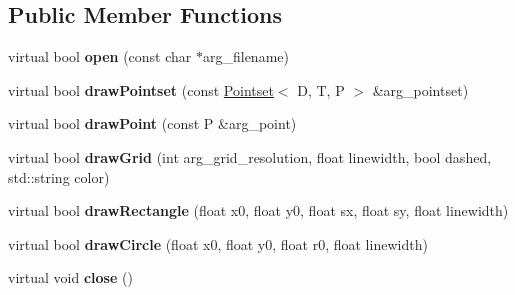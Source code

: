 \subsection*{Public Member Functions}
\begin{DoxyCompactItemize}
\item 
\hypertarget{classutk_1_1PointsetIllustrator__Model_a4e155743e54ce253799e0373ecec25b0}{virtual bool {\bfseries open} (const char $\ast$arg\-\_\-filename)}\label{classutk_1_1PointsetIllustrator__Model_a4e155743e54ce253799e0373ecec25b0}

\item 
\hypertarget{classutk_1_1PointsetIllustrator__Model_a3f846cd33157bd43504120e8807a8d13}{virtual bool {\bfseries draw\-Pointset} (const \hyperlink{classutk_1_1Pointset}{Pointset}$<$ D, T, P $>$ \&arg\-\_\-pointset)}\label{classutk_1_1PointsetIllustrator__Model_a3f846cd33157bd43504120e8807a8d13}

\item 
\hypertarget{classutk_1_1PointsetIllustrator__Model_a712da01f50740652f261ae2f5be82353}{virtual bool {\bfseries draw\-Point} (const P \&arg\-\_\-point)}\label{classutk_1_1PointsetIllustrator__Model_a712da01f50740652f261ae2f5be82353}

\item 
\hypertarget{classutk_1_1PointsetIllustrator__Model_a60a362447a462ac4ff07e26b2b77494d}{virtual bool {\bfseries draw\-Grid} (int arg\-\_\-grid\-\_\-resolution, float linewidth, bool dashed, std\-::string color)}\label{classutk_1_1PointsetIllustrator__Model_a60a362447a462ac4ff07e26b2b77494d}

\item 
\hypertarget{classutk_1_1PointsetIllustrator__Model_a222890bbb53fe9786f2e1c607f98f26d}{virtual bool {\bfseries draw\-Rectangle} (float x0, float y0, float sx, float sy, float linewidth)}\label{classutk_1_1PointsetIllustrator__Model_a222890bbb53fe9786f2e1c607f98f26d}

\item 
\hypertarget{classutk_1_1PointsetIllustrator__Model_aabd437e0ea56ed8a34334fa98b454823}{virtual bool {\bfseries draw\-Circle} (float x0, float y0, float r0, float linewidth)}\label{classutk_1_1PointsetIllustrator__Model_aabd437e0ea56ed8a34334fa98b454823}

\item 
\hypertarget{classutk_1_1PointsetIllustrator__Model_a135afddb74bb2a51ad43ef86e5834b5f}{virtual void {\bfseries close} ()}\label{classutk_1_1PointsetIllustrator__Model_a135afddb74bb2a51ad43ef86e5834b5f}


\end{DoxyCompactItemize}
